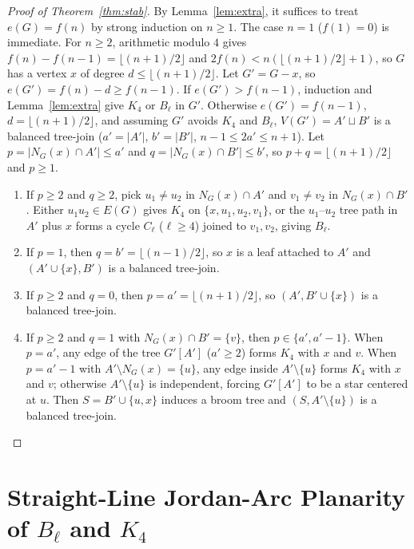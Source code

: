 \documentclass[11pt]{amsart}
\begin{document}
\begin{proof}[Proof of Theorem~\ref{thm:stab}]
By Lemma~\ref{lem:extra}, it suffices to treat $e(G) = f(n)$ by strong induction on $n \ge 1$. The case $n = 1$ ($f(1) = 0$) is immediate. For $n \ge 2$, arithmetic modulo $4$ gives $f(n) - f(n-1) = \lfloor (n+1)/2 \rfloor$ and $2f(n) < n(\lfloor (n+1)/2 \rfloor + 1)$, so $G$ has a vertex $x$ of degree $d \le \lfloor (n+1)/2 \rfloor$. Let $G' = G - x$, so $e(G') = f(n) - d \ge f(n-1)$. If $e(G') > f(n-1)$, induction and Lemma~\ref{lem:extra} give $K_4$ or $B_\ell$ in $G'$. Otherwise $e(G') = f(n-1)$, $d = \lfloor (n+1)/2 \rfloor$, and assuming $G'$ avoids $K_4$ and $B_\ell$, $V(G') = A' \sqcup B'$ is a balanced tree-join ($a' = |A'|$, $b' = |B'|$, $n-1 \le 2a' \le n+1$). Let $p = |N_G(x) \cap A'| \le a'$ and $q = |N_G(x) \cap B'| \le b'$, so $p + q = \lfloor (n+1)/2 \rfloor$ and $p \ge 1$.
\begin{enumerate}
  \item If $p \ge 2$ and $q \ge 2$, pick $u_1 \ne u_2$ in $N_G(x) \cap A'$ and $v_1 \ne v_2$ in $N_G(x) \cap B'$. Either $u_1 u_2 \in E(G)$ gives $K_4$ on $\{x, u_1, u_2, v_1\}$, or the $u_1$--$u_2$ tree path in $A'$ plus $x$ forms a cycle $C_\ell$ ($\ell \ge 4$) joined to $v_1, v_2$, giving $B_\ell$.
  \item If $p = 1$, then $q = b' = \lfloor (n-1)/2 \rfloor$, so $x$ is a leaf attached to $A'$ and $(A' \cup \{x\}, B')$ is a balanced tree-join.
  \item If $p \ge 2$ and $q = 0$, then $p = a' = \lfloor (n+1)/2 \rfloor$, so $(A', B' \cup \{x\})$ is a balanced tree-join.
  \item If $p \ge 2$ and $q = 1$ with $N_G(x) \cap B' = \{v\}$, then $p \in \{a', a' - 1\}$. When $p = a'$, any edge of the tree $G'[A']$ ($a' \ge 2$) forms $K_4$ with $x$ and $v$. When $p = a' - 1$ with $A' \setminus N_G(x) = \{u\}$, any edge inside $A' \setminus \{u\}$ forms $K_4$ with $x$ and $v$; otherwise $A' \setminus \{u\}$ is independent, forcing $G'[A']$ to be a star centered at $u$. Then $S = B' \cup \{u, x\}$ induces a broom tree and $(S, A' \setminus \{u\})$ is a balanced tree-join. \qedhere
\end{enumerate}
\end{proof}

\section{Straight-Line Jordan-Arc Planarity of $B_\ell$ and $K_4$}
\end{document}

